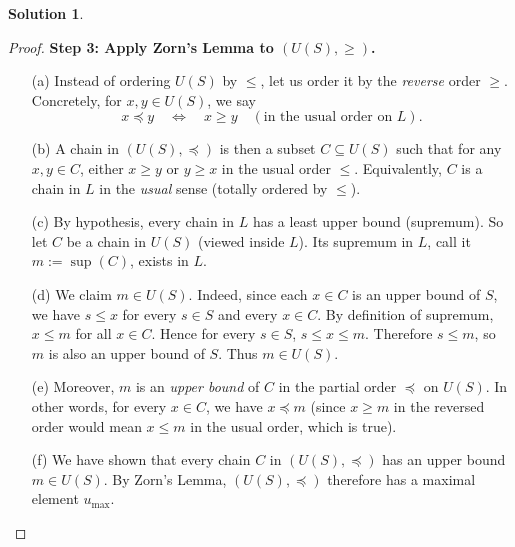 \documentclass[12pt]{article}
\theoremstyle{definition} %
\newtheorem{solution}{Solution}
\theoremstyle{plain} %
\begin{document}
\begin{solution}
\begin{proof}
            \vspace{0.3cm}
            \textbf{Step 3: Apply Zorn's Lemma to $(U(S), \ge)$.}
            \begin{enumerate}
                \item[(a)] Instead of ordering $U(S)$ by $\le$, let us order it by the \emph{reverse} order $\ge$. Concretely, for $x,y \in U(S)$, we say
                \[
                   x \preceq y \quad \Longleftrightarrow \quad x \ge y 
                   \quad (\text{in the usual order on } L).
                \]
                \item[(b)] A chain in $(U(S), \preceq)$ is then a subset $C \subseteq U(S)$ such that for any $x,y \in C$, either $x \ge y$ or $y \ge x$ in the usual order $\le$. Equivalently, $C$ is a chain in $L$ in the \emph{usual} sense (totally ordered by $\le$).
                \item[(c)] By hypothesis, every chain in $L$ has a least upper bound (supremum). So let $C$ be a chain in $U(S)$ (viewed inside $L$). Its supremum in $L$, call it $m := \sup(C)$, exists in $L$.
                \item[(d)] We claim $m \in U(S)$. Indeed, since each $x \in C$ is an upper bound of $S$, we have $s \le x$ for every $s \in S$ and every $x \in C$. By definition of supremum, $x \le m$ for all $x \in C$. Hence for every $s \in S$, $s \le x \le m$. Therefore $s \le m$, so $m$ is also an upper bound of $S$. Thus $m \in U(S)$.
                \item[(e)] Moreover, $m$ is an \emph{upper bound} of $C$ in the partial order $\preceq$ on $U(S)$. In other words, for every $x \in C$, we have $x \preceq m$ (since $x \ge m$ in the reversed order would mean $x \le m$ in the usual order, which is true).
                \item[(f)] We have shown that every chain $C$ in $(U(S), \preceq)$ has an upper bound $m \in U(S)$. By Zorn's Lemma, $(U(S), \preceq)$ therefore has a maximal element $u_{\mathrm{max}}$.
            \end{enumerate}
            

\end{proof}
\end{solution}
\end{document}
